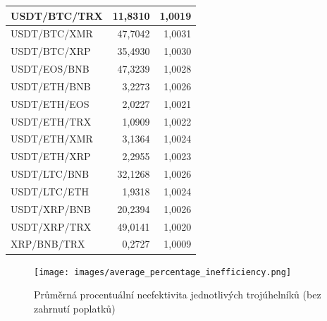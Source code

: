 \documentclass[thesis=B,czech]{FITthesis}[2019/03/21]
\begin{document}
\begin{table}
\begin{tabular}{|| l | r | r ||}
 \hline USDT/BTC/TRX & 11,8310 & 1,0019\\ 
 \hline USDT/BTC/XMR & 47,7042 & 1,0031\\ 
 \hline USDT/BTC/XRP & 35,4930 & 1,0030\\ 
 \hline USDT/EOS/BNB & 47,3239 & 1,0028\\ 
 \hline USDT/ETH/BNB & 3,2273 & 1,0026\\ 
 \hline USDT/ETH/EOS & 2,0227 & 1,0021\\ 
 \hline USDT/ETH/TRX & 1,0909 & 1,0022\\ 
 \hline USDT/ETH/XMR & 3,1364 & 1,0024\\ 
 \hline USDT/ETH/XRP & 2,2955 & 1,0023\\ 
 \hline USDT/LTC/BNB & 32,1268 & 1,0026\\ 
 \hline USDT/LTC/ETH & 1,9318 & 1,0024\\ 
 \hline USDT/XRP/BNB & 20,2394 & 1,0026\\ 
 \hline USDT/XRP/TRX & 49,0141 & 1,0020\\ 
 \hline XRP/BNB/TRX & 0,2727 & 1,0009\\ 
 \hline
\end{tabular}
\end{table}

\begin{figure}\centering
	\texttt{[image: images/average\_percentage\_inefficiency.png]}
	\caption{Průměrná procentuální neefektivita jednotlivých trojúhelníků (bez zahrnutí poplatků)}\label{average_percentage_inefficiency}
\end{figure}
\end{document}
